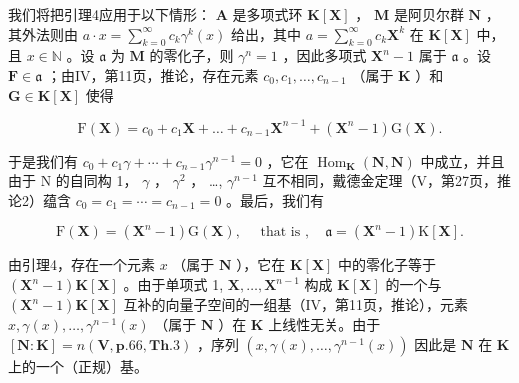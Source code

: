 我们将把引理4应用于以下情形： \(\mathbf{A}\) 是多项式环 \(\mathbf{K}[\mathbf{X}]\) ， \(\mathbf{M}\) 是阿贝尔群 \(\mathbf{N}\) ，其外法则由 \(a \cdot x = \sum_{k=0}^{\infty} c_k \gamma^k(x)\) 给出，其中 \(a = \sum_{k=0}^{\infty} c_k \mathbf{X}^k\) 在 \(\mathbf{K}[\mathbf{X}]\) 中，且 \(x \in \mathbb{N}\) 。设 \(\mathfrak{a}\) 为 \(\mathbf{M}\) 的零化子，则 \(\gamma^n = 1\) ，因此多项式 \(\mathbf{X}^n - 1\) 属于 \(\mathfrak{a}\) 。设 \(\mathbf{F} \in \mathfrak{a}\) ；由IV，第11页，推论，存在元素 \(c_0, c_1, \ldots, c_{n-1}\) （属于 \(\mathbf{K}\) ）和 \(\mathbf{G} \in \mathbf{K}[\mathbf{X}]\) 使得

\[
\mathrm{F} (\mathbf {X}) = c _ {0} + c _ {1} \mathbf {X} + \dots + c _ {n - 1} \mathbf {X} ^ {n - 1} + (\mathbf {X} ^ {n} - 1) \mathrm{G} (\mathbf {X}).\tag{11}
\]

于是我们有 \(c_{0} + c_{1}\gamma + \cdots + c_{n-1}\gamma^{n-1} = 0\) ，它在 \(\operatorname{Hom}_{\mathbf{K}}(\mathbf{N}, \mathbf{N})\) 中成立，并且由于 N 的自同构 1， \(\gamma\) ， \(\gamma^{2}\) ， \ldots, \(\gamma^{n-1}\) 互不相同，戴德金定理（V，第27页，推论2）蕴含 \(c_{0} = c_{1} = \cdots = c_{n-1} = 0\) 。最后，我们有

\[
\mathrm{F} (\mathbf {X}) = \left(\mathbf {X} ^ {n} - 1\right) \mathrm{G} (\mathbf {X}), \quad \text { that   is }, \quad \mathfrak {a} = \left(\mathbf {X} ^ {n} - 1\right) \mathrm{K} [ \mathbf {X} ].
\]

由引理4，存在一个元素 \(x\) （属于 \(\mathbf{N}\) ），它在 \(\mathbf{K}[\mathbf{X}]\) 中的零化子等于 \((\mathbf{X}^n - 1)\mathbf{K}[\mathbf{X}]\) 。由于单项式 1, \(\mathbf{X}, \ldots, \mathbf{X}^{n-1}\) 构成 \(\mathbf{K}[\mathbf{X}]\) 的一个与 \((\mathbf{X}^n - 1)\mathbf{K}[\mathbf{X}]\) 互补的向量子空间的一组基（IV，第11页，推论），元素 \(x, \gamma(x), \ldots, \gamma^{n-1}(x)\) （属于 \(\mathbf{N}\) ）在 \(\mathbf{K}\) 上线性无关。由于 \([\mathbf{N}:\mathbf{K}] = n(\mathbf{V},\mathbf{p}.66,\mathbf{Th}.3)\) ，序列 \((x,\gamma(x),\ldots,\gamma^{n-1}(x))\) 因此是 \(\mathbf{N}\) 在 \(\mathbf{K}\) 上的一个（正规）基。

